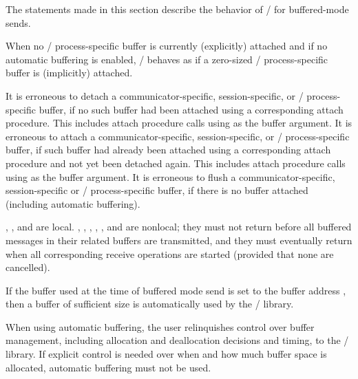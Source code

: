 The statements made in this section describe the behavior of \MPI/
for buffered-mode sends.

When no \MPI/ process-specific buffer is currently (explicitly) attached and if no automatic buffering is enabled, \MPI/ behaves as if a
zero-sized \MPI/ process-specific buffer is (implicitly) attached.

It is erroneous to detach a communicator-specific, session-specific, or \MPI/ process-specific buffer, if no such buffer had been attached using a corresponding attach procedure. This includes attach procedure calls using  as the buffer argument.
It is erroneous to attach a communicator-specific, session-specific, or \MPI/ process-specific buffer, if such buffer had already been attached using a corresponding attach procedure and not yet been detached again. This includes attach procedure calls using  as the buffer argument.
It is erroneous to flush a communicator-specific, session-specific or \MPI/ process-specific buffer, if there is no buffer attached (including automatic buffering).

, , and  are local.
, ,  ,\flushline
 ,
, and 
are nonlocal;
they must not return before all buffered messages in their related buffers are transmitted,
and they must eventually return when all corresponding receive operations are started
(provided that none are cancelled).

\label{subsec:pt2pt:auto}
If the buffer used at the time of buffered mode send is set to the buffer address , then a buffer of sufficient size is
automatically used by the \MPI/ library.

\begin{users}
When using automatic buffering, the user relinquishes control over buffer management, including allocation and deallocation decisions and timing, to the \MPI/ library. If explicit control is needed over when and how much buffer space is allocated, automatic buffering must not be used.
\end{users}


